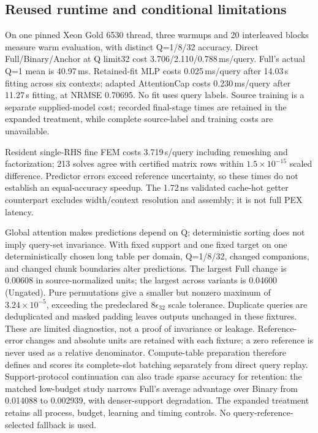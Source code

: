 \documentclass[conference,9pt,letterpaper]{IEEEtran}
\begin{document}
\subsection{Reused runtime and conditional limitations}
On one pinned Xeon Gold 6530 thread, three warmups and 20 interleaved blocks measure warm evaluation, with distinct Q=1/8/32 accuracy. Direct Full/Binary/Anchor at Q limit32 cost 3.706/2.110/0.788\,ms/query. Full's actual Q=1 mean is 40.97\,ms. Retained-fit MLP costs 0.025\,ms/query after 14.03\,s fitting across six contexts; adapted AttentionCap costs 0.230\,ms/query after 11.27\,s fitting, at NRMSE 0.70695. No fit uses query labels. Source training is a separate supplied-model cost; recorded final-stage times are retained in the expanded treatment, while complete source-label and training costs are unavailable.

Resident single-RHS fine FEM costs 3.719\,s/query including remeshing and factorization; 213 solves agree with certified matrix rows within $1.5\times10^{-15}$ scaled difference. Predictor errors exceed reference uncertainty, so these times do not establish an equal-accuracy speedup. The 1.72\,ns validated cache-hot getter counterpart excludes width/context resolution and assembly; it is not full PEX latency.

Global attention makes predictions depend on Q; deterministic sorting does not imply query-set invariance. With fixed support and one fixed target on one deterministically chosen long table per domain, Q=1/8/32, changed companions, and changed chunk boundaries alter predictions. The largest Full change is 0.00608 in source-normalized units; the largest across variants is 0.04600 (Ungated). Pure permutations give a smaller but nonzero maximum of $3.24\times10^{-5}$, exceeding the predeclared $8\epsilon_{32}$ scale tolerance. Duplicate queries are deduplicated and masked padding leaves outputs unchanged in these fixtures. These are limited diagnostics, not a proof of invariance or leakage. Reference-error changes and absolute units are retained with each fixture; a zero reference is never used as a relative denominator. Compute-table preparation therefore defines and scores its complete-slot batching separately from direct query replay. Support-protocol continuation can also trade sparse accuracy for retention: the matched low-budget study narrows Full's average advantage over Binary from 0.014088 to 0.002939, with denser-support degradation. The expanded treatment retains all process, budget, learning and timing controls. No query-reference-selected fallback is used.
\end{document}

